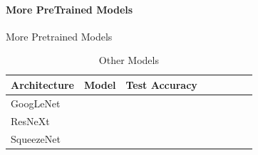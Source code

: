 \paragraph{More PreTrained Models}

More Pretrained Models


\begin{table}[t]
\small
\begin{center}
\begin{tabular}{|p{1in}|c|c|c|c|c|c|c|}
\hline
Architecture 
 & Model
 & Test Accuracy \\
\hline
GoogLeNet & & \\
\hline
ResNeXt & & \\
\hline
SqueezeNet & & \\
\hline
\end{tabular}
\end{center}
\caption{Other Models}
\label{table:models}
\end{table}




